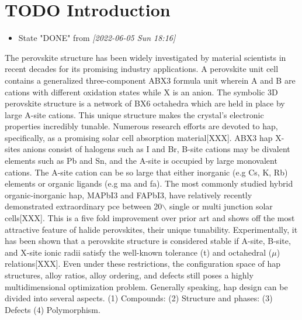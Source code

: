 \documentclass[twoside, twocolumn, 9pt, draft]{article}
\begin{document}
\renewcommand*\rmdefault{bch}\normalfont\upshape
\rmfamily
\section*{}
\vspace{-1cm}



\section*{{\bfseries\sffamily TODO} Introduction}
\label{sec:orgb53a90a}
\begin{itemize}
\item State "DONE"       from              \textit{[2022-06-05 Sun 18:16]}
\end{itemize}
The perovskite structure has been widely investigated by material
scientists in recent decades for its promising industry
applications. A perovskite unit cell contains a generalized
three-component ABX3 formula unit wherein A and B are cations with
different oxidation states while X is an anion. The symbolic 3D
perovskite structure is a network of BX6 octahedra which are held in
place by large A-site cations. This unique structure makes the
crystal's electronic properties incredibly tunable. Numerous research
efforts are devoted to \acrfull{hap}, specifically, as a
promising solar cell absorption material[XXX]. ABX3 \acrlong{hap}
X-sites anions consist of halogens such as I and Br, B-site cations
may be divalent elements such as Pb and Sn, and the A-site is occupied
by large monovalent cations. The A-site cation can be so large that
either inorganic (e.g Cs, K, Rb) elements or organic ligands (e.g
\acrfull{ma} and \acrfull{fa}). The most commonly studied
hybrid organic-inorganic \acrlong{hap}, MAPbI3 and FAPbI3, have
relatively recently demonstrated extraordinary \acrfull{pce} between 20$\backslash$%
single or multi junction solar cells[XXX]. This is a five fold
improvement over prior art and shows off the most attractive feature
of halide perovskites, their unique tunability. Experimentally, it has
been shown that a perovskite structure is considered stable if A-site,
B-site, and X-site ionic radii satisfy the well-known tolerance (t)
and octahedral (\(\mu\)) relations[XXX]. Even under these restrictions,
the configuration space of \acrshort{hap} structures, alloy ratios, alloy
ordering, and defects still poses a highly multidimensional
optimization problem.  Generally speaking, \acrlong{hap} design
can be divided into several aspects. (1) Compounds: (2) Structure and
phases: (3) Defects (4) Polymorphism.
\end{document}
